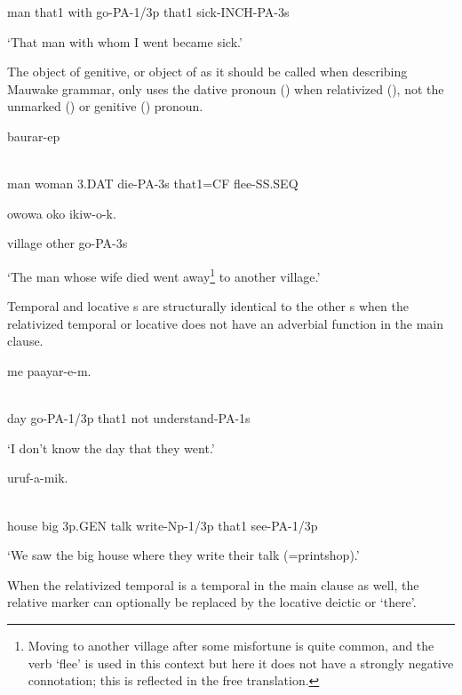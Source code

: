 man  that1  with  go-PA-1/3p  that1  sick-INCH-PA-3s

`That man with whom I went became sick.'

The object of genitive, or object of  as it should be called when describing Mauwake grammar, only uses the dative pronoun () when relativized (), not the unmarked () or genitive () pronoun.

\ea%
\label{ex:x1543}
\gll [\textbf{Mua}  emeria  \textbf{wiar}  um-o-k  nain=ke]  baurar-ep \\
      \\
\glt
\z

man  woman  3.DAT  die-PA-3s  that1=CF  flee-SS.SEQ

owowa  oko  ikiw-o-k.

village  other  go-PA-3s

`The man whose wife died went away\footnote{Moving to another village after some misfortune is quite common, and the verb `flee' is used in this context but here it does not have a strongly negative connotation; this is reflected in the free translation.} to another village.'

Temporal and locative s are structurally identical to the other s when the relativized temporal or locative  does not have an adverbial function in the main clause. 

\ea%
\label{ex:x1554}
  me  paayar-e-m. \\
      \\
\glt
\z

day  go-PA-1/3p  that1  not  understand-PA-1s

`I don't know the day that they went.'

\ea%
\label{ex:x1560}
  uruf-a-mik. \\
      \\
\glt
\z

house  big  3p.GEN  talk  write-Np-1/3p  that1  see-PA-1/3p

`We saw the big house where they write their talk (=printshop).'

When the relativized temporal  is a temporal in the main clause as well, the relative marker can optionally be replaced by the locative deictic  or  `there'.

